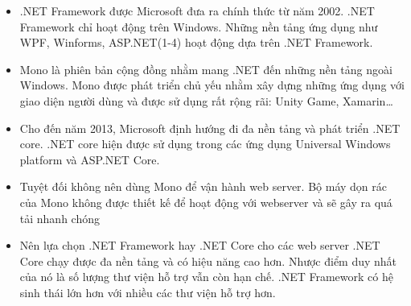\begin{itemize}
\item .NET Framework được Microsoft đưa ra chính thức từ năm 2002. .NET Framework chỉ hoạt động trên Windows. Những nền tảng ứng dụng như WPF, Winforms, ASP.NET(1-4) hoạt động dựa trên .NET Framework.
\item Mono là phiên bản cộng đồng nhằm mang .NET đến những nền tảng ngoài Windows. Mono được phát triển chủ yếu nhằm xây dựng những ứng dụng với giao diện người dùng và được sử dụng rất rộng rãi: Unity Game, Xamarin…
\item Cho đến năm 2013, Microsoft định hướng đi đa nền tảng và phát triển .NET core. .NET core hiện được sử dụng trong các ứng dụng Universal Windows platform và ASP.NET Core.
\item Tuyệt đối không nên dùng Mono để vận hành web server. Bộ máy dọn rác của Mono không được thiết kế để hoạt động với webserver và sẽ gây ra quá tải nhanh chóng
\item Nên lựa chọn .NET Framework hay .NET Core cho các web server .NET Core chạy được đa nền tảng và có hiệu năng cao hơn. Nhược điểm duy nhất của nó là số lượng thư viện hỗ trợ vẫn còn hạn chế. .NET Framework có hệ sinh thái lớn hơn với nhiều các thư viện hỗ trợ hơn.
\end{itemize}

